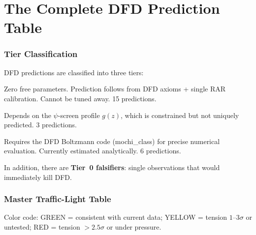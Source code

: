 \documentclass[11pt,a4paper]{article}
\begin{document}
\part{The Complete DFD Prediction Table}
\label{sec:table}

\section{Tier Classification}

DFD predictions are classified into three tiers:

\begin{description}[leftmargin=2cm,labelwidth=1.8cm]
\item[GRANITE] Zero free parameters.  Prediction follows from DFD axioms
  + single RAR calibration.  Cannot be tuned away.  15 predictions.
\item[DISTANCE-BIAS] Depends on the $\psi$-screen profile $g(z)$, which
  is constrained but not uniquely predicted.  3 predictions.
\item[BOLTZMANN] Requires the DFD Boltzmann code (mochi\_class) for
  precise numerical evaluation.  Currently estimated analytically.
  6 predictions.
\end{description}

In addition, there are \textbf{Tier~0 falsifiers}: single observations
that would immediately kill DFD.


\section{Master Traffic-Light Table}
\label{sec:master-table}

Color code: \colorbox{green!25}{GREEN} = consistent with current data;
\colorbox{yellow!35}{YELLOW} = tension $1$--$3\sigma$ or untested;
\colorbox{red!25}{RED} = tension $> 2.5\sigma$ or under pressure.
\end{document}
